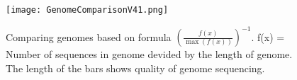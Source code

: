 \documentclass[table,
12pt, %
a4paper, %
oneside, %
headinclude,footinclude, %
BCOR5mm, %
]{scrartcl}
\begin{document}
\begin{figure}[htbp]
  \centering
  \texttt{[image: GenomeComparisonV41.png]}
  \caption[Genome Comparison]{Comparing genomes based on formula ${(\frac{f(x)}{\max(f(x))})}^{-1}$. f(x) = Number of sequences in genome devided by the length of genome. The length of the bars shows quality of genome sequencing.} %
  \label{fig:gallery}
\end{figure}

\end{document}
